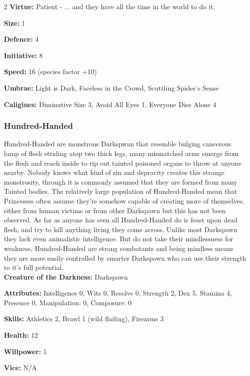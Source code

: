 \begin{multicols}{2}
\noindent \textbf{Virtue:} Patient - ... and they have all the time in the world to do it.

\noindent \textbf{Size:} 1

\noindent \textbf{Defence:} 4

\noindent \textbf{Initiative:} 8

\noindent \textbf{Speed:} 16 (species factor +10)

\noindent \textbf{Umbrae:} Light is Dark, Faceless in the Crowd, Scuttling Spider's Sense

\noindent \textbf{Caligines:} Diminutive Size 3, Avoid All Eyes 1, Everyone Dies Alone 4

\subsubsection*{Hundred-Handed}

Hundred-Handed are monstrous Darkspwan that resemble bulging cancerous lump of flesh striding atop two thick legs, many mismatched arms emerge from the flesh and reach inside to rip out tainted poisoned organs to throw at anyone nearby. Nobody knows what kind of sin and depravity creates this strange monstrosity, through it is commonly assumed that they are formed from many Tainted bodies. The relatively large population of Hundred-Handed mean that Princesses often assume they're somehow capable of creating more of themselves, either from human victims or from other Darkspawn but this has not been observed. As far as anyone has seen all Hundred-Handed do is feast upon dead flesh, and try to kill anything living they come across. Unlike most Darkspawn they lack even animalistic intelligence. But do not take their mindlessness for weakness, Hundred-Handed are strong combatants and being mindless means they are more easily controlled by smarter Darkspawn who can use their strength to it's full potential. \\

\noindent \textbf{Creature of the Darkness:} Darkspawn

\noindent \textbf{Attributes:} Intelligence 0, Wits 0, Resolve 0, Strength 2, Dex 5, Stamina 4, Presence 0, Manipulation: 0, Composure: 0

\noindent \textbf{Skills:} Athletics 2, Brawl 1 (wild flailing), Firearms 3

\noindent \textbf{Health:} 12

\noindent \textbf{Willpower:} 1

\noindent \textbf{Vice:} N/A


\end{multicols}

